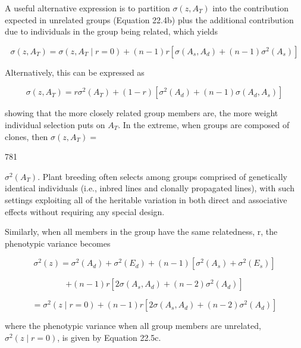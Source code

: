 \documentclass{article}
\begin{document}
A useful alternative expression is to partition  $ \sigma(z, A_T) $ into the contribution expected in unrelated groups (Equation 22.4b) plus the additional contribution due to individuals in the group being related, which yields

\begin{equation}
\sigma(z,A_{T})=\sigma(z,A_{T}\mid r=0)+(n-1)r\left[\sigma\left(A_{s},A_{d}\right)+(n-1)\sigma^{2}\left(A_{s}\right)\right]
\tag{22.12d}
\label{eq:22_12d}
\end{equation}

Alternatively, this can be expressed as

\begin{equation}
\sigma(z,A_{T})=r\sigma^{2}(A_{T})+(1-r)\left[\sigma^{2}(A_{d})+(n-1)\sigma(A_{d},A_{s})\right]
\tag{22.12e}
\label{eq:22_12e}
\end{equation}

showing that the more closely related group members are, the more weight individual selection puts on  $ A_T $. In the extreme, when groups are composed of clones, then  $ \sigma(z, A_T) = $

781

 $ \sigma^{2}(A_{T}) $. Plant breeding often selects among groups comprised of genetically identical individuals (i.e., inbred lines and clonally propagated lines), with such settings exploiting all of the heritable variation in both direct and associative effects without requiring any special design.

Similarly, when all members in the group have the same relatedness, r, the phenotypic variance becomes

\begin{equation}
\sigma^{2}(z)=\sigma^{2}(A_{d})+\sigma^{2}(E_{d})+(n-1)\left[\sigma^{2}(A_{s})+\sigma^{2}(E_{s})\right]
\end{equation}

\begin{equation}
+(n-1)r\left[2\sigma(A_{s},A_{d})+(n-2)\sigma^{2}(A_{d})\right]
\tag{22.13a}
\label{eq:22_13a}
\end{equation}

\begin{equation}
=\sigma^{2}(z\mid r=0)+(n-1)r\left[2\sigma(A_{s},A_{d})+(n-2)\sigma^{2}(A_{d})\right]
\tag{22.13b}
\label{eq:22_13b}
\end{equation}

where the phenotypic variance when all group members are unrelated,  $ \sigma^{2}(z \mid r = 0) $, is given by Equation 22.5c.
\end{document}
